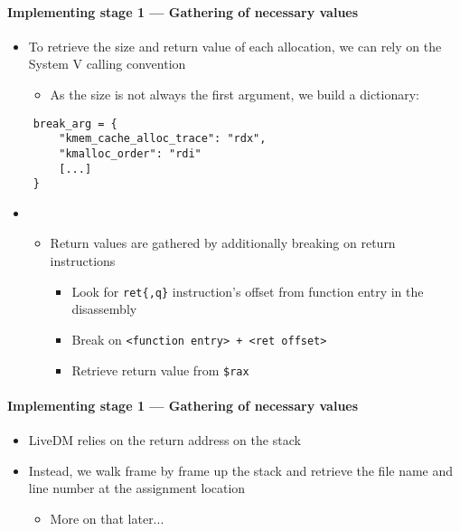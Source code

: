 \documentclass{i20lecture}
\begin{document}
\begin{frame}[fragile]{\insertsection}
  \framesubtitle{Implementing stage 1 --- Gathering of necessary values}

    \begin{itemize}
     \item To retrieve the size and return value of each allocation, we can rely on the System V calling convention
\pause
     \begin{itemize}
      \item As the size is not always the first argument, we build a dictionary:
     \end{itemize}
    \end{itemize}
    \begin{lstlisting}
    break_arg = {
        "kmem_cache_alloc_trace": "rdx",
        "kmalloc_order": "rdi"
        [...]
    }
    \end{lstlisting}
\pause
	\begin{itemize}
	\item[]
	\begin{itemize}
		\item Return values are gathered by additionally breaking on return instructions
		\pause
		\begin{itemize}
			\item Look for \lstinline|ret{,q}| instruction's offset from function entry in the disassembly
			\pause
			\item Break on \lstinline|<function entry> + <ret offset>|
			\pause
			\item Retrieve return value from \lstinline|$rax|
		\end{itemize}
	\end{itemize}
	\end{itemize}
\end{frame}

\begin{frame}{\insertsection}
  \framesubtitle{Implementing stage 1 --- Gathering of necessary values}

    \begin{itemize}
     \item LiveDM relies on the return address on the stack
\pause
     \item Instead, we walk frame by frame up the stack and retrieve the file name and line number at the assignment location
\pause
     \begin{itemize}
      \item More on that later...
     \end{itemize}
    \end{itemize}
\end{frame}
\end{document}
